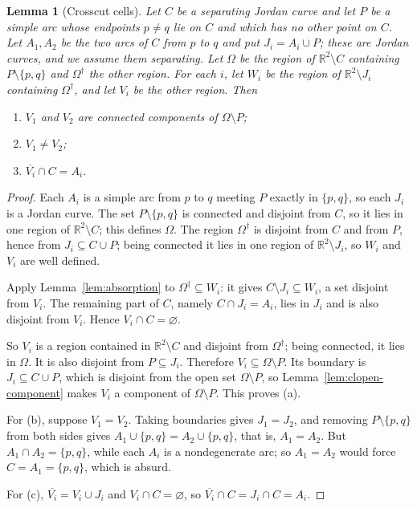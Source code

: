 \documentclass[11pt]{article}
\theoremstyle{mainplain}
\newtheorem{lemma}[theorem]{Lemma}
\theoremstyle{mainroman}
\theoremstyle{definition}
\newcommand{\alphlabels}{\renewcommand{\labelenumi}{\textup{(\alph{enumi})}}%
  \renewcommand{\theenumi}{\alph{enumi}}}
\numberwithin{equation}{section}
\begin{document}
\begin{lemma}[Crosscut cells]\label{lem:crosscut-cells}
Let $C$ be a separating Jordan curve and let $P$ be a simple arc whose
endpoints $p\ne q$ lie on $C$ and which has no other point on $C$. Let
$A_1,A_2$ be the two arcs of $C$ from $p$ to $q$ and put $J_i=A_i\cup
P$; these are Jordan curves, and we assume them separating. Let
$\Omega$ be the region of $\mathbb R^2\setminus C$ containing
$P\setminus\{p,q\}$ and $\Omega^\dagger$ the other region. For each
$i$, let $W_i$ be the region of $\mathbb R^2\setminus J_i$ containing
$\Omega^\dagger$, and let $V_i$ be the other region. Then
\begin{enumerate}\alphlabels
\item $V_1$ and $V_2$ are connected components of $\Omega\setminus P$;
\item $V_1\ne V_2$;
\item $\overline{V_i}\cap C=A_i$.
\end{enumerate}
\end{lemma}
\begin{proof}
Each $A_i$ is a simple arc from $p$ to $q$ meeting $P$ exactly in
$\{p,q\}$, so each $J_i$ is a Jordan curve. The set $P\setminus\{p,q\}$
is connected and disjoint from $C$, so it lies in one region of
$\mathbb R^2\setminus C$; this defines $\Omega$. The region
$\Omega^\dagger$ is disjoint from $C$ and from $P$, hence from
$J_i\subseteq C\cup P$; being connected it lies in one region of
$\mathbb R^2\setminus J_i$, so $W_i$ and $V_i$ are well defined.

Apply Lemma~\ref{lem:absorption} to $\Omega^\dagger\subseteq W_i$: it
gives $C\setminus J_i\subseteq W_i$, a set disjoint from $V_i$. The
remaining part of $C$, namely $C\cap J_i=A_i$, lies in $J_i$ and is
also disjoint from $V_i$. Hence $V_i\cap C=\varnothing$.

So $V_i$ is a region contained in $\mathbb R^2\setminus C$ and disjoint
from $\Omega^\dagger$; being connected, it lies in $\Omega$. It is also
disjoint from $P\subseteq J_i$. Therefore
$V_i\subseteq\Omega\setminus P$. Its boundary is $J_i\subseteq C\cup
P$, which is disjoint from the open set $\Omega\setminus P$, so
Lemma~\ref{lem:clopen-component} makes $V_i$ a component of
$\Omega\setminus P$. This proves (a).

For (b), suppose $V_1=V_2$. Taking boundaries gives $J_1=J_2$, and
removing $P\setminus\{p,q\}$ from both sides gives
$A_1\cup\{p,q\}=A_2\cup\{p,q\}$, that is, $A_1=A_2$. But
$A_1\cap A_2=\{p,q\}$, while each $A_i$ is a nondegenerate arc; so
$A_1=A_2$ would force $C=A_1=\{p,q\}$, which is absurd.

For (c), $\overline{V_i}=V_i\cup J_i$ and $V_i\cap C=\varnothing$, so
$\overline{V_i}\cap C=J_i\cap C=A_i$.
\end{proof}
\end{document}
